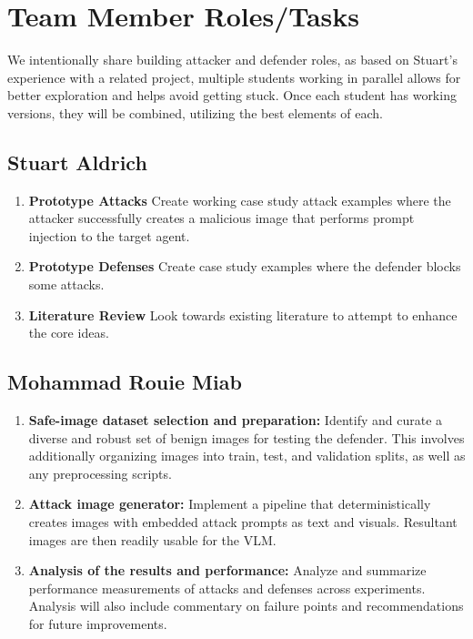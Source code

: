 \documentclass[10pt,twocolumn,letterpaper]{article}
\begin{document}
\section{Team Member Roles/Tasks}
\label{sec:roles}

We intentionally share building attacker and defender roles, as based on Stuart's experience with a related project, multiple students working in parallel allows for better exploration and helps avoid getting stuck. Once each student has working versions, they will be combined, utilizing the best elements of each.

\subsection{Stuart Aldrich}

\begin{enumerate}

\item \textbf{Prototype Attacks} Create working case study attack examples where the attacker successfully creates a malicious image that performs prompt injection to the target agent.
\item \textbf{Prototype Defenses} Create case study examples where the defender blocks some attacks.
\item \textbf{Literature Review} Look towards existing literature to attempt to enhance the core ideas. 

\end{enumerate}

\subsection{Mohammad Rouie Miab}

\begin{enumerate}

\item \textbf{Safe-image dataset selection and preparation:} Identify and curate a diverse and robust set of benign images for testing the defender. This involves additionally organizing images into train, test, and validation splits, as well as any preprocessing scripts.
\item \textbf{Attack image generator:} Implement a pipeline that deterministically creates images with embedded attack prompts as text and visuals. Resultant images are then readily usable for the VLM.
\item \textbf{Analysis of the results and performance:} Analyze and summarize performance measurements of attacks and defenses across experiments. Analysis will also include commentary on failure points and recommendations for future improvements.

\end{enumerate}
\end{document}
